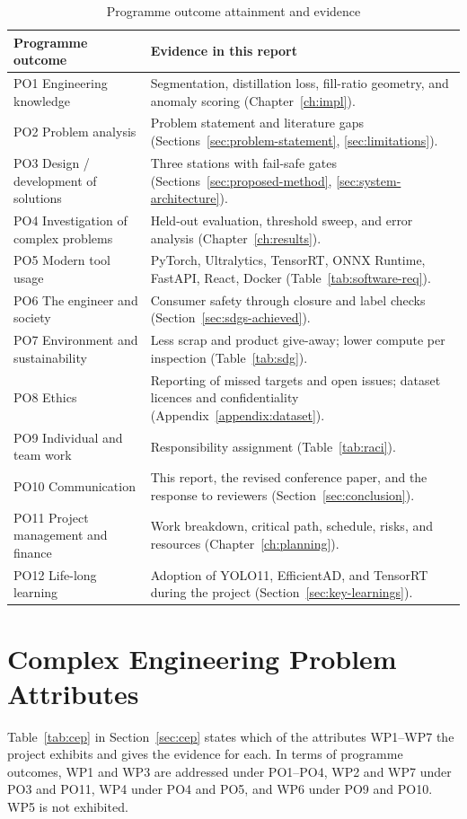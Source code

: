 \begin{table}[htbp]
\centering
\caption{Programme outcome attainment and evidence}
\label{tab:po-just}
\begin{tabularx}{\textwidth}{|L{4.6cm}|X|}
\hline
\textbf{Programme outcome} & \textbf{Evidence in this report} \\ \hline
PO1 Engineering knowledge & Segmentation, distillation loss, fill-ratio geometry, and anomaly scoring (Chapter~\ref{ch:impl}). \\ \hline
PO2 Problem analysis & Problem statement and literature gaps (Sections~\ref{sec:problem-statement}, \ref{sec:limitations}). \\ \hline
PO3 Design / development of solutions & Three stations with fail-safe gates (Sections~\ref{sec:proposed-method}, \ref{sec:system-architecture}). \\ \hline
PO4 Investigation of complex problems & Held-out evaluation, threshold sweep, and error analysis (Chapter~\ref{ch:results}). \\ \hline
PO5 Modern tool usage & PyTorch, Ultralytics, TensorRT, ONNX Runtime, FastAPI, React, Docker (Table~\ref{tab:software-req}). \\ \hline
PO6 The engineer and society & Consumer safety through closure and label checks (Section~\ref{sec:sdgs-achieved}). \\ \hline
PO7 Environment and sustainability & Less scrap and product give-away; lower compute per inspection (Table~\ref{tab:sdg}). \\ \hline
PO8 Ethics & Reporting of missed targets and open issues; dataset licences and confidentiality (Appendix~\ref{appendix:dataset}). \\ \hline
PO9 Individual and team work & Responsibility assignment (Table~\ref{tab:raci}). \\ \hline
PO10 Communication & This report, the revised conference paper, and the response to reviewers (Section~\ref{sec:conclusion}). \\ \hline
PO11 Project management and finance & Work breakdown, critical path, schedule, risks, and resources (Chapter~\ref{ch:planning}). \\ \hline
PO12 Life-long learning & Adoption of YOLO11, EfficientAD, and TensorRT during the project (Section~\ref{sec:key-learnings}). \\ \hline
\end{tabularx}
\end{table}

\section{Complex Engineering Problem Attributes}
Table~\ref{tab:cep} in Section~\ref{sec:cep} states which of the attributes WP1--WP7 the project exhibits and gives the evidence for each. In terms of programme outcomes, WP1 and WP3 are addressed under PO1--PO4, WP2 and WP7 under PO3 and PO11, WP4 under PO4 and PO5, and WP6 under PO9 and PO10. WP5 is not exhibited.

